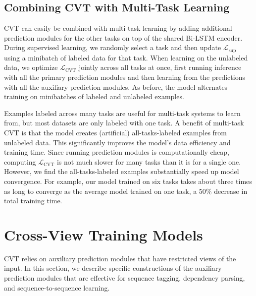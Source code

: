 \documentclass[11pt,a4paper]{article}
\newcommand{\loss} { \mathcal{L} }
\newcommand{\lsup} { \loss_\text{sup} }
\newcommand{\lunsup} { \loss_\text{CVT} }
\begin{document}
\subsection{Combining CVT with Multi-Task Learning}

CVT can easily be combined with multi-task learning by adding additional prediction modules for the other tasks on top of the shared Bi-LSTM encoder.
During supervised learning, we randomly select a task and then update $\lsup$ using a minibatch of labeled data for that task.
When learning on the unlabeled data, we optimize $\lunsup$ jointly across all tasks at once, first running inference with all the primary prediction modules and then learning from the predictions with all the auxiliary prediction modules. 
As before, the model alternates training on minibatches of labeled and unlabeled examples.

Examples labeled across many tasks are useful for multi-task systems to learn from, but most datasets are only labeled with one task. 
A benefit of multi-task CVT is that the model creates (artificial) all-tasks-labeled examples from unlabeled data. 
This significantly improves the model's data efficiency and training time. 
Since running prediction modules is computationally cheap, computing $\lunsup$ is not much slower for many tasks than it is for a single one.
However, we find the all-tasks-labeled examples substantially speed up model convergence.
For example, our model trained on six tasks takes about three times as long to converge as the average model trained on one task, a 50\% decrease in total training time. 



\section{Cross-View Training Models}
\label{sec:models}

CVT relies on auxiliary prediction modules that have restricted views of the input. In this section, we describe specific constructions of the auxiliary prediction modules that are effective for sequence tagging, dependency parsing, and sequence-to-sequence learning.
\end{document}
